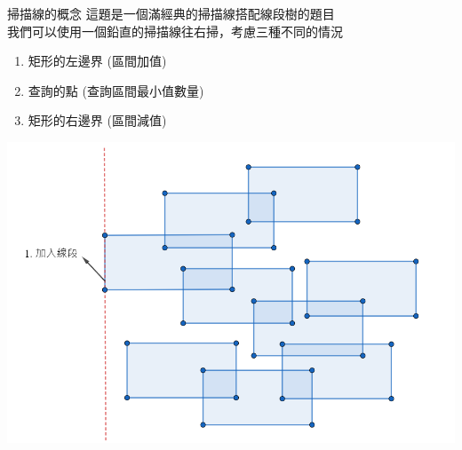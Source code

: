 \documentclass[aspectratio=169]{beamer}
\begin{document}
\begin{frame}{掃描線的概念}
    這題是一個滿經典的掃描線搭配線段樹的題目 \\
    \vspace{2.5mm}
    我們可以使用一個鉛直的掃描線往右掃，考慮三種不同的情況 \\
    \begin{enumerate}
        \item 矩形的左邊界 (區間加值)
        \item 查詢的點 (查詢區間最小值數量)
        \item 矩形的右邊界 (區間減值)
    \end{enumerate}
    \begin{center}
        \includegraphics[scale=0.25]{images/rectangle_area_2.png}
    \end{center}
\end{frame}
\end{document}
